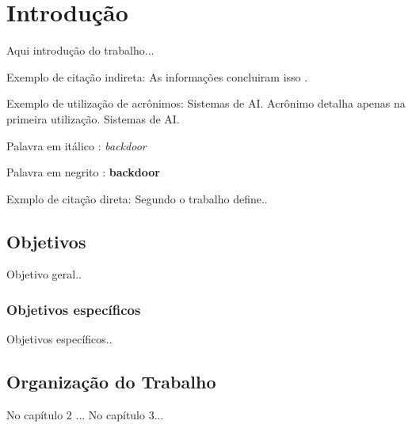 
\chapter[Introdução]{Introdução}

Aqui introdução do trabalho...

Exemplo de citação indireta: As informações concluiram isso \cite{schwab2016fourth}. 

Exemplo de utilização de acrônimos: Sistemas de \ac{AI}. Acrônimo detalha apenas na primeira utilização. Sistemas de \ac{AI}.

Palavra em itálico : \textit{backdoor}

Palavra em negrito : \textbf{backdoor}

Exmplo de citação direta: Segundo  o trabalho define..

\section{Objetivos}
Objetivo geral..

\subsection{Objetivos específicos}
Objetivos específicos..


\section{Organização do Trabalho}

No capítulo 2 ... No capítulo 3...